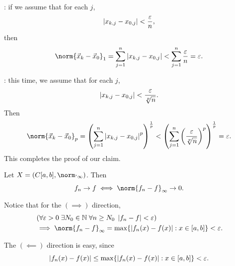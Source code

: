 \documentclass[notoc,notitlepage]{tufte-book}
\begin{document}
\begin{eg}
  \noindent{} : if we assume that for each $j$,
  \begin{equation*}
    \left| x_{k, j} - x_{0, j} \right| < \frac{\varepsilon}{n},
  \end{equation*}
  then
  \begin{equation*}
    \norm{\vec{x}_k - \vec{x}_0}_1 = \sum_{j=1}^{n} \abs{ x_{k, j} - x_{0, j} } < \sum_{j=1}^{n} \frac{\epsilon}{n} = \epsilon.
  \end{equation*}

  \noindent{} : this time, we assume that for each $j$,
  \begin{equation*}
    \left| x_{k, j} - x_{0, j} \right| < \frac{\varepsilon}{\sqrt[p]{n}}.
  \end{equation*}
  Then
  \begin{equation*}
    \norm{ \vec{x}_k - \vec{x}_0 }_p = {\left( \sum_{j=1}^{n} {\abs{ x_{k, j} - x_{0, j} }}^p \right)}^{\frac{1}{p}} < {\left( \sum_{j=1}^{n} {\left( \frac{\epsilon}{\sqrt[p]{n}} \right)}^p \right)}^{\frac{1}{p}} = \epsilon.
  \end{equation*}
  This completes the proof of our claim.
\end{eg}

\begin{eg}
  Let $X = ( C[a, b], \norm\cdot_\infty )$. Then
  \begin{equation*}
    f_n \to f \iff \norm{ f_n - f }_\infty \to 0.
  \end{equation*}

  \noindent Notice that for the $(\implies)$ direction,
  \begin{align*}
    &\left( \forall \epsilon > 0 \; \exists N_0 \in \mathbb{N} \; \forall n \geq N_0 \; \abs{ f_n - f } < \epsilon \right) \\
    &\implies \norm{ f_n - f }_\infty = \max \{ \abs{ f_n(x) - f(x) } : x \in [a, b] \} < \epsilon.
  \end{align*}

  The $(\impliedby)$ direction is easy, since
  \begin{equation*}
    \left| f_n(x) - f(x) \right| \leq \max \{ \left| f_n(x) - f(x) \right| : x \in [a, b] \} < \varepsilon.
  \end{equation*}
\end{eg}
\end{document}
